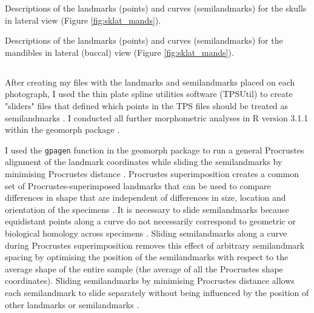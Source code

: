 \begin{table}[!htb]
\caption[Skulls: lateral landmarks]
		{Descriptions of the landmarks (points) and curves (semilandmarks) for the skulls in lateral view (Figure \ref{fig:sklat_mands}).} 

\label{tab:sklat}
\end{table}

\begin{table}[!htb]			
	\centering
	\caption[Mandibles: landmarks]
		{Descriptions of the landmarks (points) and curves (semilandmarks) for the mandibles in lateral (buccal) view (Figure \ref{fig:sklat_mands}).}
	
	\label{tab:mands} 
\end{table}


\newpage
\subsection{}
\label{sect:procrustes}

	After creating my files with the landmarks and semilandmarks placed on each photograph, I used the thin plate spline utilities software (TPSUtil) \citep{Rohlf2012} to create "sliders" files that defined which points in the TPS files should be treated as semilandmarks \citep{Zelditch2012}. I conducted all further morphometric analyses in R version 3.1.1 \citep{Team2014} within the geomorph package \citep{Adams2013}.

	
	I used the \texttt{gpagen} function in the geomorph package \citep{Adams2013} to run a general Procrustes alignment \citep{Rohlf1993} of the landmark coordinates while sliding the semilandmarks by minimising Procrustes distance \citep{Bookstein1997}. Procrustes superimposition creates a common set of Procrustes-superimposed landmarks that can be used to compare differences in shape that are independent of differences in size, location and orientation of the specimens \citep{Webster2010}. It is necessary to slide semilandmarks because equidistant points along a curve do not necessarily correspond to geometric or biological homology across specimens \citep{Gunz2013}. Sliding semilandmarks along a curve during Procrustes superimposition removes this effect of arbitrary semilandmark spacing by optimising the position of the semilandmarks with respect to the average shape of the entire sample (the average of all the Procrustes shape coordinates). Sliding semilandmarks by minimising Procrustes distance \citep[the sum of squared distances between corresponding points of two Procrustes-superimposed shapes,][]{Zelditch2012} allows each semilandmark to slide separately without being influenced by the position of other landmarks or semilandmarks \citep{Gunz2013}. 
	
